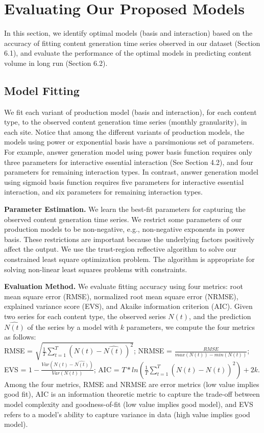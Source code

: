 \section{Evaluating Our Proposed Models}
In this section, we identify optimal models (basis and interaction) based on the accuracy of fitting content generation time series observed in our dataset (Section 6.1), and evaluate the performance of the optimal models in predicting content volume in long run (Section 6.2).

\subsection{Model Fitting}
We fit each variant of production model (basis and interaction), for each content type, to the observed content generation time series (monthly granularity), in each  site. Notice that among the different variants of production models, the models using power or exponential basis have a parsimonious set of parameters. For example, answer generation model using power basis function requires only three parameters for interactive essential interaction (See Section 4.2), and four parameters for remaining interaction types. In contrast, answer generation model using sigmoid basis function requires five parameters for interactive essential interaction, and six parameters for remaining interaction types. 

\textbf{Parameter Estimation.} We learn the best-fit parameters for capturing the observed content generation time series. We restrict some parameters of our production models to be non-negative, e.g., non-negative exponents in power basis. These restrictions are important because the underlying factors positively affect the output. We use the trust-region reflective algorithm \cite{branch1999} to solve our constrained least square optimization problem. The algorithm is appropriate for solving non-linear least squares problems with constraints.

\textbf{Evaluation Method.} We evaluate fitting accuracy using four metrics: root mean square error (RMSE), normalized root mean square error (NRMSE), explained variance score (EVS), and Akaike information criterion (AIC). Given two series for each content type, the observed series $N(t)$, and the prediction $\hat{N(t)}$ of the series by a model with $k$ parameters, we compute the four metrics as follows:\\ RMSE = $\sqrt{\frac{1}{T}\sum_{t=1}^{T}(N(t)-\hat{N(t)})^2}$; NRMSE = $\frac{RMSE}{max(N(t))-min(N(t))}$; EVS = $1-\frac{Var(N(t)-\hat{N(t)})}{Var(N(t))}$; AIC = $T*ln(\frac{1}{T}\sum_{t=1}^{T}(N(t)-\hat{N(t)})^2)+2k$. Among the four metrics, RMSE and NRMSE are error metrics (low value implies good fit), AIC is an information theoretic metric to capture the trade-off between model complexity and goodness-of-fit (low value implies good model), and EVS refers to a model's ability to capture variance in data (high value implies good model).

